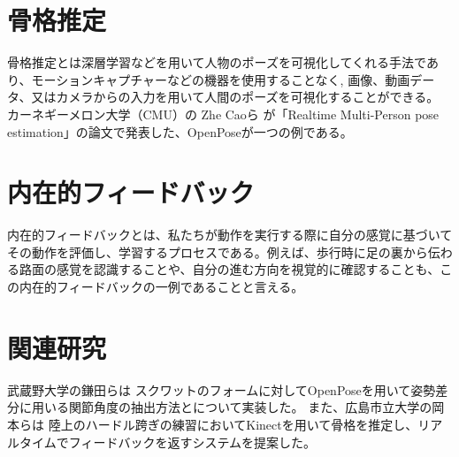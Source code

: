 \section{骨格推定}
骨格推定とは深層学習などを用いて人物のポーズを可視化してくれる手法であり、モーションキャプチャーなどの機器を使用することなく,
画像、動画データ、又はカメラからの入力を用いて人間のポーズを可視化することができる。
カーネギーメロン大学（CMU）の Zhe Caoら が「Realtime Multi-Person pose estimation」\cite{openpose}の論文で発表した、OpenPoseが一つの例である。

\section{内在的フィードバック}
内在的フィードバックとは、私たちが動作を実行する際に自分の感覚に基づいてその動作を評価し、学習するプロセスである。例えば、歩行時に足の裏から伝わる路面の感覚を認識することや、自分の進む方向を視覚的に確認することも、この内在的フィードバックの一例であることと言える。\cite{nagoyahml_feedback}
\section{関連研究}
武蔵野大学の鎌田らは \cite{Relatedresearch1}スクワットのフォームに対してOpenPoseを用いて姿勢差分に用いる関節角度の抽出方法とについて実装した。
また、広島市立大学の岡本らは \cite{Relatedresearch2}陸上のハードル跨ぎの練習においてKinectを用いて骨格を推定し、リアルタイムでフィードバックを返すシステムを提案した。